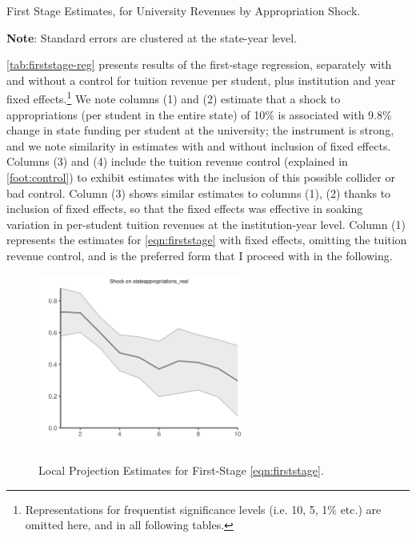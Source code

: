 \documentclass[notitlepage,12pt]{article}
\begin{document}
\begin{table}[h!]
    \singlespacing
    \centering
    \caption{First Stage Estimates, for University Revenues by Appropriation Shock.}
    \makebox[\textwidth][c]{}
    \label{tab:firststage-reg}
    \begin{flushleft}
        \footnotesize
        \textbf{Note}: Standard errors are clustered at the state-year level.
    \end{flushleft}
\end{table}

\autoref{tab:firststage-reg} presents results of the first-stage regression, separately with and without a control for tuition revenue per student, plus institution and year fixed effects.\footnote{
    Representations for frequentist significance levels (i.e. 10, 5, 1\% etc.) are omitted here, and in all following tables.
}
We note columns (1) and (2) estimate that a shock to appropriations (per student in the entire state) of 10\% is associated with 9.8\% change in state funding per student at the university; the instrument is strong, and we note similarity in estimates with and without inclusion of fixed effects.
Columns (3) and (4) include the tuition revenue control (explained in \autoref{foot:control}) to exhibit estimates with the inclusion of this possible collider or bad control.
Column (3) shows similar estimates to columns (1), (2) thanks to inclusion of fixed effects, so that the fixed effects was effective in soaking variation in per-student tuition revenues at the institution-year level.
Column (1) represents the estimates for \autoref{eqn:firststage} with fixed effects, omitting the tuition revenue control, and is the preferred form that I proceed with in the following.

\begin{figure}[h!]
    \centering
    \singlespacing
    \caption{Local Projection Estimates for First-Stage \autoref{eqn:firststage}.}
    \includegraphics[width=0.6\textwidth]{figures/firststage-lp.png}
    \label{fig:firststage-lp}
\end{figure}
\end{document}
